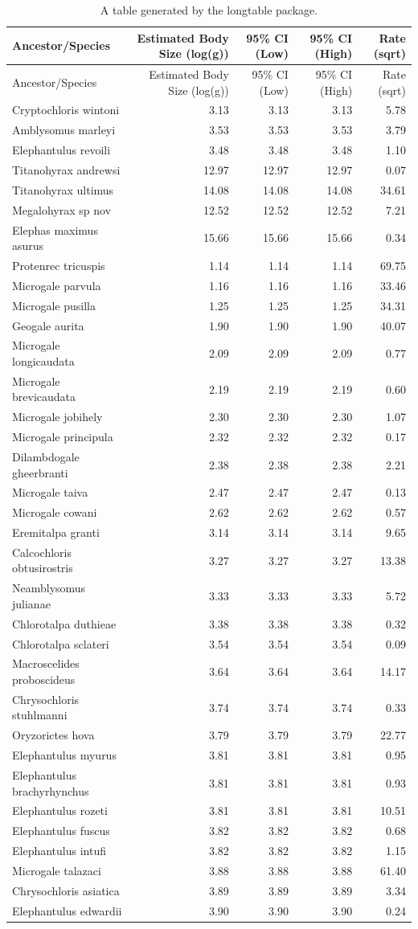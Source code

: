 \documentclass[10pt,letterpaper]{article}
\begin{document}
\begin{longtable}[]{@{}lrrrr@{}}
\caption{A table generated by the longtable package.}\tabularnewline
\toprule
Ancestor/Species & Estimated Body Size (log(g)) & 95\% CI (Low) & 95\%
CI (High) & Rate (sqrt)\tabularnewline
\midrule
\endfirsthead
\toprule
Ancestor/Species & Estimated Body Size (log(g)) & 95\% CI (Low) & 95\%
CI (High) & Rate (sqrt)\tabularnewline
\midrule
\endhead
Cryptochloris wintoni & 3.13 & 3.13 & 3.13 & 5.78\tabularnewline
Amblysomus marleyi & 3.53 & 3.53 & 3.53 & 3.79\tabularnewline
Elephantulus revoili & 3.48 & 3.48 & 3.48 & 1.10\tabularnewline
Titanohyrax andrewsi & 12.97 & 12.97 & 12.97 & 0.07\tabularnewline
Titanohyrax ultimus & 14.08 & 14.08 & 14.08 & 34.61\tabularnewline
Megalohyrax sp nov & 12.52 & 12.52 & 12.52 & 7.21\tabularnewline
Elephas maximus asurus & 15.66 & 15.66 & 15.66 & 0.34\tabularnewline
Protenrec tricuspis & 1.14 & 1.14 & 1.14 & 69.75\tabularnewline
Microgale parvula & 1.16 & 1.16 & 1.16 & 33.46\tabularnewline
Microgale pusilla & 1.25 & 1.25 & 1.25 & 34.31\tabularnewline
Geogale aurita & 1.90 & 1.90 & 1.90 & 40.07\tabularnewline
Microgale longicaudata & 2.09 & 2.09 & 2.09 & 0.77\tabularnewline
Microgale brevicaudata & 2.19 & 2.19 & 2.19 & 0.60\tabularnewline
Microgale jobihely & 2.30 & 2.30 & 2.30 & 1.07\tabularnewline
Microgale principula & 2.32 & 2.32 & 2.32 & 0.17\tabularnewline
Dilambdogale gheerbranti & 2.38 & 2.38 & 2.38 & 2.21\tabularnewline
Microgale taiva & 2.47 & 2.47 & 2.47 & 0.13\tabularnewline
Microgale cowani & 2.62 & 2.62 & 2.62 & 0.57\tabularnewline
Eremitalpa granti & 3.14 & 3.14 & 3.14 & 9.65\tabularnewline
Calcochloris obtusirostris & 3.27 & 3.27 & 3.27 & 13.38\tabularnewline
Neamblysomus julianae & 3.33 & 3.33 & 3.33 & 5.72\tabularnewline
Chlorotalpa duthieae & 3.38 & 3.38 & 3.38 & 0.32\tabularnewline
Chlorotalpa sclateri & 3.54 & 3.54 & 3.54 & 0.09\tabularnewline
Macroscelides proboscideus & 3.64 & 3.64 & 3.64 & 14.17\tabularnewline
Chrysochloris stuhlmanni & 3.74 & 3.74 & 3.74 & 0.33\tabularnewline
Oryzorictes hova & 3.79 & 3.79 & 3.79 & 22.77\tabularnewline
Elephantulus myurus & 3.81 & 3.81 & 3.81 & 0.95\tabularnewline
Elephantulus brachyrhynchus & 3.81 & 3.81 & 3.81 & 0.93\tabularnewline
Elephantulus rozeti & 3.81 & 3.81 & 3.81 & 10.51\tabularnewline
Elephantulus fuscus & 3.82 & 3.82 & 3.82 & 0.68\tabularnewline
Elephantulus intufi & 3.82 & 3.82 & 3.82 & 1.15\tabularnewline
Microgale talazaci & 3.88 & 3.88 & 3.88 & 61.40\tabularnewline
Chrysochloris asiatica & 3.89 & 3.89 & 3.89 & 3.34\tabularnewline
Elephantulus edwardii & 3.90 & 3.90 & 3.90 & 0.24\tabularnewline

\end{longtable}
\end{document}
